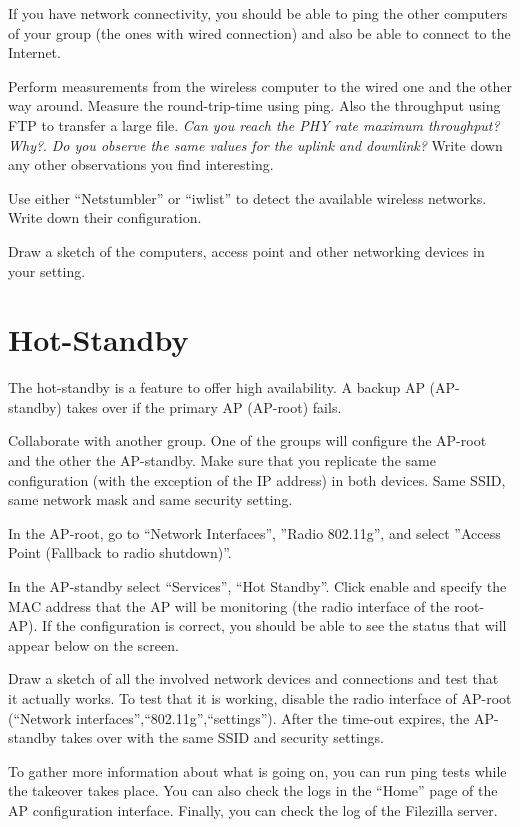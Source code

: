 If you have network connectivity, you should be able to ping the other computers of your group (the ones with wired connection) and also be able to connect to the Internet.

Perform measurements from the wireless computer to the wired one and the other way around.
Measure the round-trip-time using ping.
Also the throughput using FTP to transfer a large file.
\emph{Can you reach the PHY rate maximum throughput? Why?}.
\emph{Do you observe the same values for the uplink and downlink?}
Write down any other observations you find interesting.

Use either ``Netstumbler'' or ``iwlist'' to detect the available wireless networks.
Write down their configuration.

Draw a sketch of the computers, access point and other networking devices in your setting.

\section{Hot-Standby}

The hot-standby is a feature to offer high availability.
A backup AP (AP-standby) takes over if the primary AP (AP-root) fails.

Collaborate with another group.
One of the groups will configure the AP-root and the other the AP-standby.
Make sure that you replicate the same configuration (with the exception of the IP address) in both devices.
Same SSID, same network mask and same security setting.

In the AP-root, go to ``Network Interfaces'', ''Radio 802.11g'', and select ''Access Point (Fallback to radio shutdown)''.

In the AP-standby select ``Services'', ``Hot Standby''.
Click enable and specify the MAC address that the AP will be monitoring (the radio interface of the root-AP).
If the configuration is correct, you should be able to see the status that will appear below on the screen.

Draw a sketch of all the involved network devices and connections and test that it actually works.
To test that it is working, disable the radio interface of AP-root (``Network interfaces'',``802.11g'',``settings'').
After the time-out expires, the AP-standby takes over with the same SSID and security settings.

To gather more information about what is going on, you can run ping tests while the takeover takes place.
You can also check the logs in the ``Home'' page of the AP configuration interface.
Finally, you can check the log of the Filezilla server.

